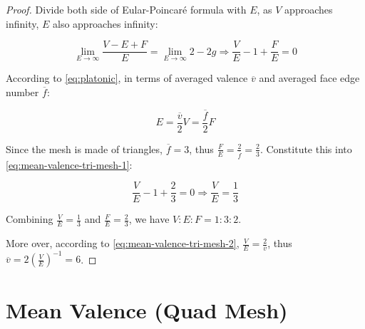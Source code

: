 \begin{proof}
    Divide both side of Eular-Poincar\'e formula with $E$, as $V$ approaches infinity, $E$ also approaches infinity:

    \begin{equation}
        \lim_{E \to \infty} \frac{V - E + F}{E} = \lim_{E \to \infty} 2 - 2g
        \Rightarrow \frac{V}{E} - 1 + \frac{F}{E} = 0
        \label{eq:mean-valence-tri-mesh-1}
    \end{equation}

    According to \autoref{eq:platonic}, in terms of averaged valence $\overline{v}$ and averaged face edge number $\overline{f}$:

    \begin{equation}
        E = \frac{\overline{v}}{2} V = \frac{\overline{f}}{2} F
        \label{eq:mean-valence-tri-mesh-2}
    \end{equation}

    Since the mesh is made of triangles, $\overline{f} = 3$, thus $\frac{F}{E} = \frac{2}{\overline{f}} = \frac{2}{3}$. Constitute this into \autoref{eq:mean-valence-tri-mesh-1}:

    \begin{equation}
        \frac{V}{E} - 1 + \frac{2}{3} = 0
        \Rightarrow \frac{V}{E} = \frac{1}{3}
    \end{equation}

    Combining $\frac{V}{E} = \frac{1}{3}$ and $\frac{F}{E} = \frac{2}{3}$, we have $V:E:F = 1:3:2$.

    More over, according to \autoref{eq:mean-valence-tri-mesh-2}, $\frac{V}{E} = \frac{2}{\overline{v}}$, thus $\overline{v} = 2(\frac{V}{E})^{-1} = 6$.
\end{proof}

\section{Mean Valence (Quad Mesh)}
    
